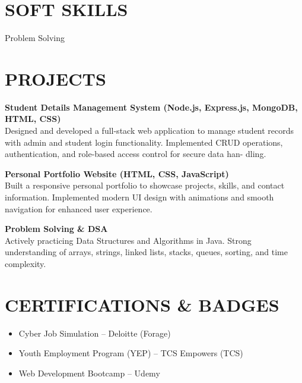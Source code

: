 \documentclass[9.5pt,a4paper]{extarticle}
\begin{document}
\section*{SOFT SKILLS}
\noindent Problem Solving \vspace{4pt}



\section*{PROJECTS}
\noindent \textbf{Student Details Management System (Node.js, Express.js, MongoDB, HTML, CSS)} \\
Designed and developed a full-stack web application to manage student records with admin and student login functionality. Implemented CRUD operations, authentication, and role-based access control for secure data han- dling. \vspace{4pt}

\noindent \textbf{Personal Portfolio Website (HTML, CSS, JavaScript)} \\
Built a responsive personal portfolio to showcase projects, skills, and contact information. Implemented modern UI design with animations and smooth navigation for enhanced user experience. \vspace{4pt}

\noindent \textbf{Problem Solving \& DSA} \\
Actively practicing Data Structures and Algorithms in Java. Strong understanding of arrays, strings, linked lists, stacks, queues, sorting, and time complexity. \vspace{4pt}


\section*{CERTIFICATIONS \& BADGES}
\begin{itemize}[leftmargin=0.2in, itemsep=1pt, topsep=1pt]
    \item Cyber Job Simulation -- Deloitte (Forage)
    \item Youth Employment Program (YEP) -- TCS Empowers (TCS)
    \item Web Development Bootcamp -- Udemy
\end{itemize}
\end{document}

